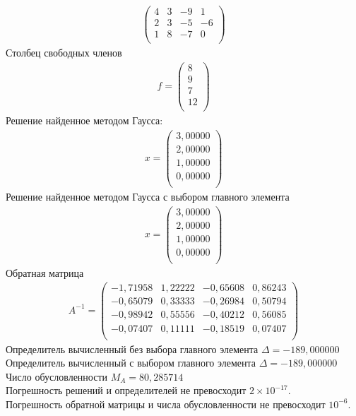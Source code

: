 \documentclass[a4paper,12pt,titlepage,finall]{article}
\begin{document}
\begin{enumerate}
\begin{align*}
\begin{pmatrix}
         4&           3&          -9&           1 \\
         2&           3&          -5&          -6 \\
         1&           8&          -7&           0 \\
\end{pmatrix}
\end{align*}
Столбец свободных членов
\begin{align*}
f = \begin{pmatrix}
8 \\
         9 \\
         7 \\
        12 \\
\end{pmatrix}
\end{align*}
Решение найденное методом Гаусса:
\begin{align*}
x = \begin{pmatrix}
3,00000 \\
   2,00000 \\
   1,00000 \\
   0,00000 \\
\end{pmatrix}
\end{align*}
Решение найденное методом Гаусса с выбором главного элемента
\begin{align*}
x = \begin{pmatrix}
3,00000 \\
   2,00000 \\
   1,00000 \\
   0,00000 \\
\end{pmatrix}
\end{align*}
Обратная матрица
\begin{align*}
A^{-1} = \begin{pmatrix}
  -1,71958&     1,22222&    -0,65608&     0,86243 \\
  -0,65079&     0,33333&    -0,26984&     0,50794 \\
  -0,98942&     0,55556&    -0,40212&     0,56085 \\
  -0,07407&     0,11111&    -0,18519&     0,07407 \\
\end{pmatrix}
\end{align*}
Определитель вычисленный без выбора главного элемента  $\Delta = -189,000000$\\
Определитель вычисленный с выбором главного элемента $\Delta = -189,000000$\\
Число обусловленности $M_A = 80,285714$\\
Погрешность решений и определителей не превосходит $2 \times 10^{-17}$.\\
Погрешность обратной матрицы и числа обусловленности не превосходит $10^{-6}$.


\end{enumerate}
\end{document}
